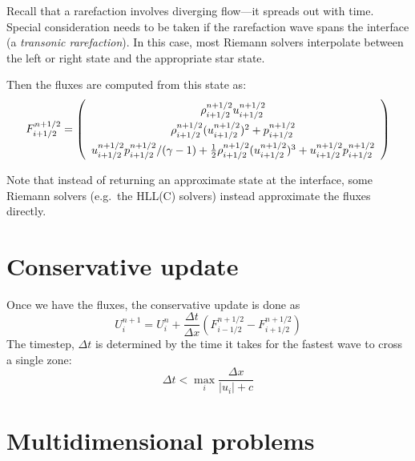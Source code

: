 \documentclass[11pt]{article}
\begin{document}
Recall that a rarefaction involves diverging flow---it spreads out
with time.  Special consideration needs to be taken if the rarefaction
wave spans the interface (a {\em transonic rarefaction}).  In this
case, most Riemann solvers interpolate between the left or right state
and the appropriate star state.

Then the fluxes are computed from this state as:
\begin{equation}
\renewcommand{\arraystretch}{1.5}
F_{i+1/2}^{n+1/2} = \left ( \begin{array}{c}
                             \rho_{i+1/2}^{n+1/2} u_{i+1/2}^{n+1/2} \\
                             \rho_{i+1/2}^{n+1/2} (u_{i+1/2}^{n+1/2})^2 + p_{i+1/2}^{n+1/2} \\
                             u_{i+1/2}^{n+1/2} p_{i+1/2}^{n+1/2} / (\gamma - 1)  +
                             \frac{1}{2} \rho_{i+1/2}^{n+1/2} (u_{i+1/2}^{n+1/2})^3 +
                             u_{i+1/2}^{n+1/2} p_{i+1/2}^{n+1/2}
                            \end{array} \right )
\renewcommand{\arraystretch}{1.0}
\end{equation}

Note that instead of returning an approximate state at the interface,
some Riemann solvers (e.g.\ the HLL(C) solvers) instead approximate the
fluxes directly.

\section{Conservative update}

Once we have the fluxes, the conservative update is done as
\begin{equation}
U^{n+1}_i = U^n_i + \frac{\Delta t}{\Delta x} \left ( F_{i-1/2}^{n+1/2} - F_{i+1/2}^{n+1/2} \right )
\end{equation}
The timestep, $\Delta t$ is determined by the time it takes for the fastest
wave to cross a single zone:
\begin{equation}
\Delta t < \max_i \frac{\Delta x}{|u_i| + c}
\end{equation}
              


\section{Multidimensional problems}
\end{document}
